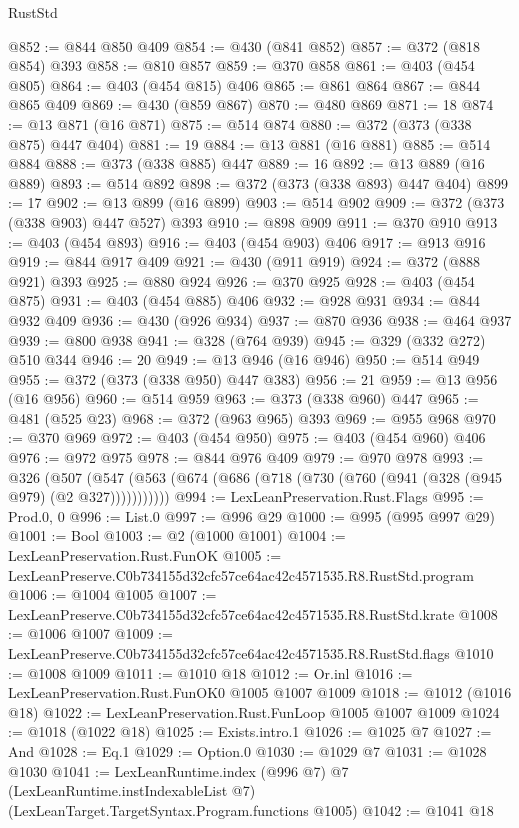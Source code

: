 \begin{lexlean}{RustStd}
\begin{coremodule}
@852 := @844 @850 @409
@854 := @430 (@841 @852)
@857 := @372 (@818 @854) @393
@858 := @810 @857
@859 := @370 @858
@861 := @403 (@454 @805)
@864 := @403 (@454 @815) @406
@865 := @861 @864
@867 := @844 @865 @409
@869 := @430 (@859 @867)
@870 := @480 @869
@871 := 18
@874 := @13 @871 (@16 @871)
@875 := @514 @874
@880 := @372 (@373 (@338 @875) @447 @404)
@881 := 19
@884 := @13 @881 (@16 @881)
@885 := @514 @884
@888 := @373 (@338 @885) @447
@889 := 16
@892 := @13 @889 (@16 @889)
@893 := @514 @892
@898 := @372 (@373 (@338 @893) @447 @404)
@899 := 17
@902 := @13 @899 (@16 @899)
@903 := @514 @902
@909 := @372 (@373 (@338 @903) @447 @527) @393
@910 := @898 @909
@911 := @370 @910
@913 := @403 (@454 @893)
@916 := @403 (@454 @903) @406
@917 := @913 @916
@919 := @844 @917 @409
@921 := @430 (@911 @919)
@924 := @372 (@888 @921) @393
@925 := @880 @924
@926 := @370 @925
@928 := @403 (@454 @875)
@931 := @403 (@454 @885) @406
@932 := @928 @931
@934 := @844 @932 @409
@936 := @430 (@926 @934)
@937 := @870 @936
@938 := @464 @937
@939 := @800 @938
@941 := @328 (@764 @939)
@945 := @329 (@332 @272) @510 @344
@946 := 20
@949 := @13 @946 (@16 @946)
@950 := @514 @949
@955 := @372 (@373 (@338 @950) @447 @383)
@956 := 21
@959 := @13 @956 (@16 @956)
@960 := @514 @959
@963 := @373 (@338 @960) @447
@965 := @481 (@525 @23)
@968 := @372 (@963 @965) @393
@969 := @955 @968
@970 := @370 @969
@972 := @403 (@454 @950)
@975 := @403 (@454 @960) @406
@976 := @972 @975
@978 := @844 @976 @409
@979 := @970 @978
@993 := @326
    (@507 (@547 (@563 (@674 (@686 (@718 (@730 (@760 (@941 (@328 (@945 @979) (@2 @327)))))))))))
@994 := LexLeanPreservation.Rust.Flags
@995 := Prod.{0, 0}
@996 := List.{0}
@997 := @996 @29
@1000 := @995 (@995 @997 @29)
@1001 := Bool
@1003 := @2 (@1000 @1001)
@1004 := LexLeanPreservation.Rust.FunOK
@1005 := LexLeanPreserve.C0b734155d32cfc57ce64ac42c4571535.R8.RustStd.program
@1006 := @1004 @1005
@1007 := LexLeanPreserve.C0b734155d32cfc57ce64ac42c4571535.R8.RustStd.krate
@1008 := @1006 @1007
@1009 := LexLeanPreserve.C0b734155d32cfc57ce64ac42c4571535.R8.RustStd.flags
@1010 := @1008 @1009
@1011 := @1010 @18
@1012 := Or.inl
@1016 := LexLeanPreservation.Rust.FunOK0 @1005 @1007 @1009
@1018 := @1012 (@1016 @18)
@1022 := LexLeanPreservation.Rust.FunLoop @1005 @1007 @1009
@1024 := @1018 (@1022 @18)
@1025 := Exists.intro.{1}
@1026 := @1025 @7
@1027 := And
@1028 := Eq.{1}
@1029 := Option.{0}
@1030 := @1029 @7
@1031 := @1028 @1030
@1041 := LexLeanRuntime.index
    (@996 @7)
    @7
    (LexLeanRuntime.instIndexableList @7)
    (LexLeanTarget.TargetSyntax.Program.functions @1005)
@1042 := @1041 @18

\end{coremodule}
\end{lexlean}
